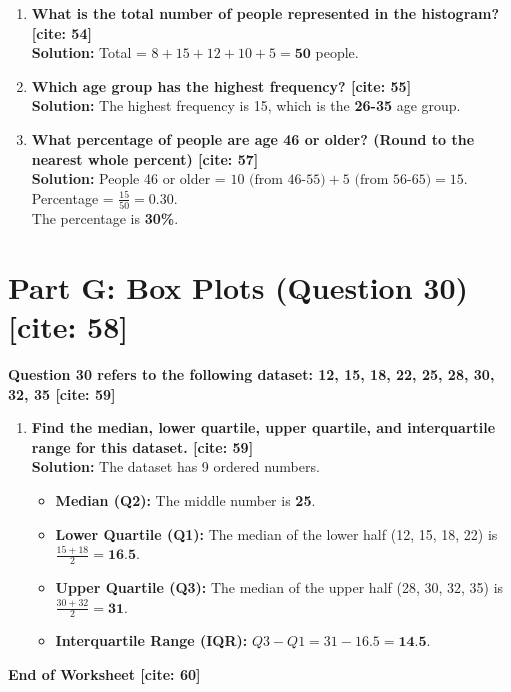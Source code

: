 \documentclass[11pt]{article}
\begin{document}
\begin{enumerate}[resume]
    \item \textbf{What is the total number of people represented in the histogram? [cite: 54]} \\
    \textbf{Solution:} Total = $8 + 15 + 12 + 10 + 5 = \textbf{50}$ people.
    
    \item \textbf{Which age group has the highest frequency? [cite: 55]} \\
    \textbf{Solution:} The highest frequency is 15, which is the \textbf{26-35} age group.
    
    \item \textbf{What percentage of people are age 46 or older? (Round to the nearest whole percent) [cite: 57]} \\
    \textbf{Solution:} People 46 or older = $10 \text{ (from 46-55)} + 5 \text{ (from 56-65)} = 15$. \\
    Percentage = $\frac{15}{50} = 0.30$. \\
    The percentage is \textbf{30\%}.
\end{enumerate}

\section*{Part G: Box Plots (Question 30) [cite: 58]}

\noindent \textbf{Question 30 refers to the following dataset: 12, 15, 18, 22, 25, 28, 30, 32, 35 [cite: 59]}

\begin{enumerate}[resume]
    \item \textbf{Find the median, lower quartile, upper quartile, and interquartile range for this dataset. [cite: 59]} \\
    \textbf{Solution:} The dataset has 9 ordered numbers.
    \begin{itemize}
        \item \textbf{Median (Q2):} The middle number is \textbf{25}.
        \item \textbf{Lower Quartile (Q1):} The median of the lower half (12, 15, 18, 22) is $\frac{15 + 18}{2} = \textbf{16.5}$.
        \item \textbf{Upper Quartile (Q3):} The median of the upper half (28, 30, 32, 35) is $\frac{30 + 32}{2} = \textbf{31}$.
        \item \textbf{Interquartile Range (IQR):} $Q3 - Q1 = 31 - 16.5 = \textbf{14.5}$.
    \end{itemize}
\end{enumerate}

\vspace{1cm}
\begin{center}
    \textbf{End of Worksheet [cite: 60]}
\end{center}
\end{document}
